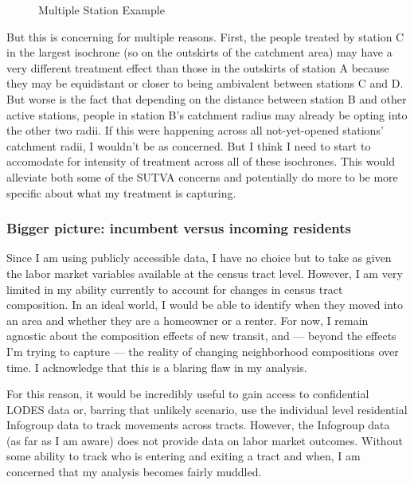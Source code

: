 \documentclass[12pt]{article}
\begin{document}
\begin{figure}[H]
    \centering
    \caption{Multiple Station Example}
\end{figure}
But this is concerning for multiple reasons. First, the people treated by station C in the largest isochrone (so on the outskirts of the catchment area) may have a very different treatment effect than those in the outskirts of station A because they may be equidistant or closer to being ambivalent between stations C and D. But worse is the fact that depending on the distance between station B and other active stations, people in station B's catchment radius may already be opting into the other two radii. If this were happening across all not-yet-opened stations' catchment radii, I wouldn't be as concerned. But I think I need to start to accomodate for intensity of treatment across all of these isochrones. This would alleviate both some of the SUTVA concerns and potentially do more to be more specific about what my treatment is capturing. 

\subsubsection{Bigger picture: incumbent versus incoming residents}\label{subsubsec:incumbents}
Since I am using publicly accessible data, I have no choice but to take as given the labor market variables available at the census tract level. However, I am very limited in my ability currently to account for changes in census tract composition. In an ideal world, I would be able to identify when they moved into an area and whether they are a homeowner or a renter. For now, I remain agnostic about the composition effects of new transit, and --- beyond the effects I'm trying to capture --- the reality of changing neighborhood compositions over time. I acknowledge that this is a blaring flaw in my analysis. 

For this reason, it would be incredibly useful to gain access to confidential LODES data or, barring that unlikely scenario, use the individual level residential Infogroup data to track movements across tracts. However, the Infogroup data (as far as I am aware) does not provide data on labor market outcomes. Without some ability to track who is entering and exiting a tract and when, I am concerned that my analysis becomes fairly muddled. 
\end{document}
